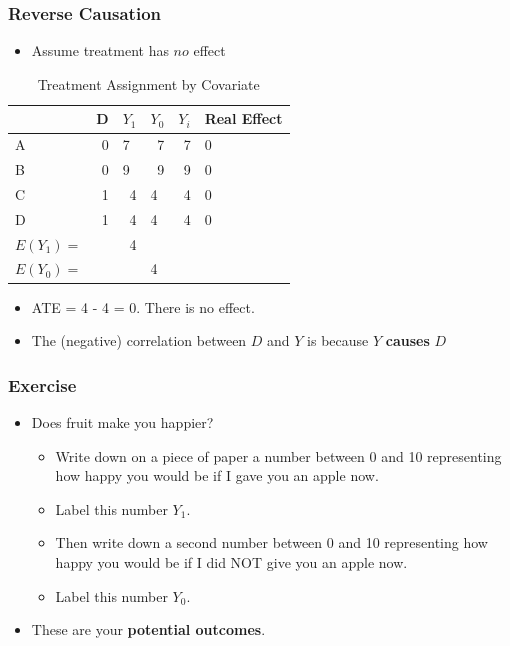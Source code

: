 \documentclass[xcolor=x11names,compress]{beamer}\usepackage[]{graphicx}\usepackage[]{color}
\renewcommand{\(}{\begin{columns}}
\renewcommand{\)}{\end{columns}}
\newcommand{\<}[1]{\begin{column}{#1}}
\renewcommand{\>}{\end{column}}
\begin{document}
\begin{frame}
\frametitle{Reverse Causation}
\begin{itemize}
\item Assume treatment has $no$ effect
\end{itemize}
\begin{table}[htbp]
  \centering
  \caption{Treatment Assignment by Covariate}
    \begin{tabular}{|l|r|r|l|r|l|}
    \hline
          &  \multicolumn{1}{l|}{D} & \multicolumn{1}{l|}{$Y_1$} & $Y_0$  & \multicolumn{1}{l|}{$Y_i$} & Real Effect \bigstrut\\
    \hline
    A     & 0     & \multicolumn{1}{l|}{7} & \multicolumn{1}{r|}{\cellcolor{teal}7} & 7     & 0 \bigstrut\\
    \hline
    B     & 0     & \multicolumn{1}{l|}{9} & \multicolumn{1}{r|}{\cellcolor{teal}9} & 9     & 0 \bigstrut\\
    \hline
    C     &  1     & \cellcolor{teal}4     & 4     & 4     & 0 \bigstrut\\
    \hline
    D     & 1     & \cellcolor{teal}4     & 4     & 4     & 0 \bigstrut\\
    \hline\pause
    $E(Y_1)=$ & & 4 & & \bigstrut\\
    \hline
    $E(Y_0)=$ &  & & 4 & \bigstrut\\
    \hline
    \end{tabular}%
  \label{tab:addlabel}%
\end{table}%
\begin{itemize}
\pause
\item ATE = 4 - 4 = 0. There is no effect. 
\item The (negative) correlation between $D$ and $Y$ is because $Y$ \textbf{causes} $D$
\end{itemize}
\end{frame}

\begin{frame}
\frametitle{Exercise}
\begin{itemize}
\item Does fruit make you happier? 
\pause
\begin{itemize}
\item Write down on a piece of paper a number between 0 and 10 representing how happy you would be if I gave you an apple now. 
\pause
\item Label this number $Y_1$.
\pause
\item Then write down a second number between 0 and 10 representing how happy you would be if I did NOT give you an apple now. 
\pause
\item Label this number $Y_0$.
\pause
\end{itemize}
\item These are your \textbf{potential outcomes}.
\end{itemize}
\end{frame}
\end{document}
